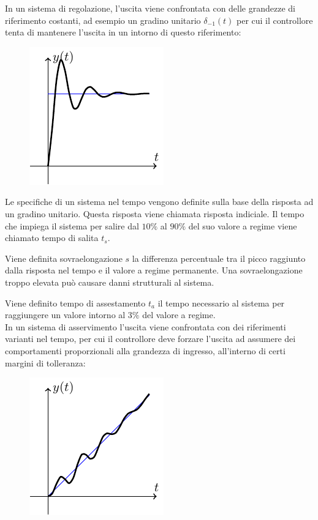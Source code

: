 \documentclass{article}
\numberwithin{equation}{subsection}
\begin{document}
In un sistema di regolazione, l'uscita viene confrontata con delle grandezze di riferimento costanti, ad esempio un gradino unitario $\delta_{-1}(t)$ per cui il controllore 
tenta di mantenere l'uscita in un intorno di questo riferimento:

\begin{figure}[H]%
    \centering
    \includegraphics{regolazione.pdf}%
\end{figure}

Le specifiche di un sistema nel tempo vengono definite sulla base della risposta ad un gradino unitario. Questa risposta viene chiamata risposta indiciale. Il tempo 
che impiega il sistema per salire dal $10\%$ al $90\%$ del suo valore a regime viene chiamato tempo di salita $t_s$. 

Viene definita sovraelongazione $s$ la differenza percentuale tra il picco raggiunto dalla risposta nel tempo e il valore a regime permanente. Una sovraelongazione troppo 
elevata può causare danni strutturali al sistema. 

Viene definito tempo di assestamento $t_a$ il tempo necessario al sistema per raggiungere un valore intorno al $3\%$ del valore a regime. 
\\
In un sistema di asservimento l'uscita viene confrontata con dei riferimenti varianti nel tempo, per cui il controllore deve forzare l'uscita ad assumere dei comportamenti 
proporzionali alla grandezza di ingresso, all'interno di certi margini di tolleranza: 

\begin{figure}[H]%
    \centering
    \includegraphics{asservimento.pdf}%
\end{figure}
\end{document}
